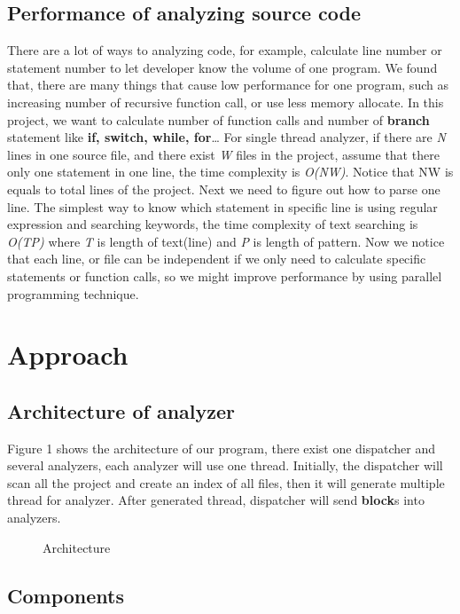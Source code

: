 \documentclass{acm_proc_article-sp}
\begin{document}
\subsection{Performance of analyzing source code}
	There are a lot of ways to analyzing code, for example, calculate
	line number or statement number to let developer know the 
	volume of one program. We found that, there are many things that
	cause low performance for one program, such as increasing number 
	of recursive function call, or use less memory allocate.
	In this project, we want to calculate number of function calls and 
	number of \textbf{branch} statement like \textbf{if, switch, while, for}\ldots
	For single thread analyzer, if there are \textit{N} lines in one source file, 
	and there exist \textit{W} files in the project, assume that there only one 
	statement in one line, the time complexity is \textit{O(NW)}. Notice that
	NW is equals to total lines of the project.
	Next we need to figure out how to parse one line. The simplest way 
	to know which statement in specific line is using regular expression 
	and searching keywords, the time complexity of text searching is 
	\textit{O(TP)} where \textit{T} is length of text(line) and \textit{P} is length
	of pattern. Now we notice that each line, or file can be independent 
	if we only need to calculate specific statements or function calls, so
	we might improve performance by using parallel programming technique.

\section{Approach}
\subsection{Architecture of analyzer}
	Figure 1 shows the architecture of our program, there exist one dispatcher 
	and several analyzers, each analyzer will use one thread. Initially, the 
	dispatcher will scan all the project and create an index of all files, then
	it will generate multiple thread for analyzer. After generated thread, 
	dispatcher will send \textbf{block}s into analyzers.

\begin{figure}
	\centering
	\caption{Architecture}
\end{figure}


\subsection{Components}
\end{document}
